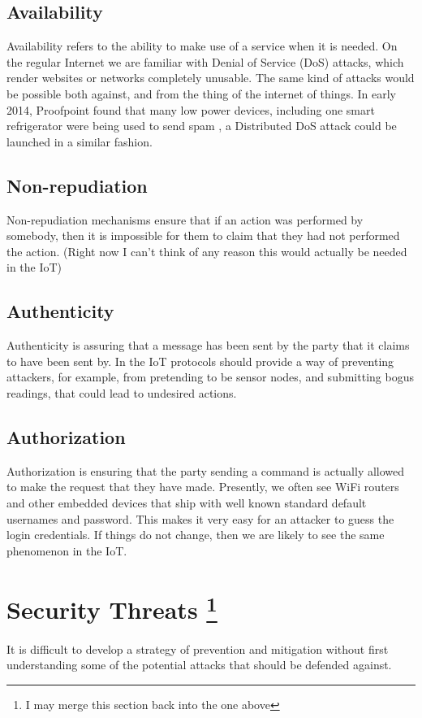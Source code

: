 \documentclass[12pt,journal,compsoc]{IEEEtran}
\begin{document}
\subsection{Availability}
Availability refers to the ability to make use of a service when it is needed.
On the regular Internet we are familiar with Denial of Service (DoS) attacks,
which render websites or networks completely unusable. The same kind of attacks
would be possible both against, and from the thing of the internet of things.
In early 2014, Proofpoint found that many low power devices, including one
smart refrigerator were being used to send spam \cite{Proofpoint2014}, a
Distributed DoS attack could be launched in a similar fashion.  

\subsection{Non-repudiation}
Non-repudiation mechanisms ensure that if an action was performed by somebody,
then it is impossible for them to claim that they had not performed the action.
(Right now I can't think of any reason this would actually be needed in the
IoT) 

\subsection{Authenticity}
Authenticity is assuring that a message has been sent by the party that it
claims to have been sent by. In the IoT protocols should provide a way of
preventing attackers, for example, from pretending to be sensor nodes, and
submitting bogus readings, that could lead to undesired actions.  

\subsection{Authorization}
Authorization is ensuring that the party sending a command is actually allowed
to make the request that they have made. Presently, we often see WiFi routers
and other embedded devices that ship with well known standard default usernames
and password. This makes it very easy for an attacker to guess the login
credentials. If things do not change, then we are likely to see the same
phenomenon in the IoT. 


\section{Security Threats \footnote{I may merge this section back into the one above} }
It is difficult to develop a strategy of prevention and mitigation without
first understanding some of the potential attacks that should be defended
against.  
\end{document}

